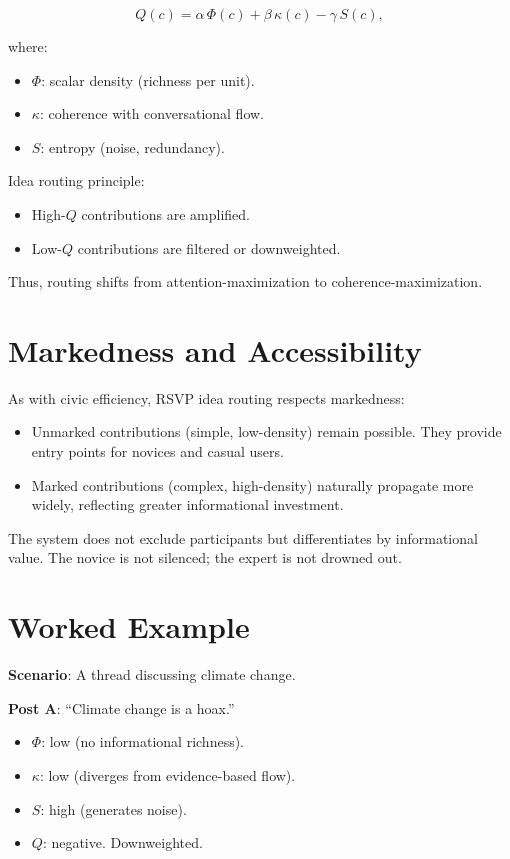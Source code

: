 \documentclass[openany]{book}
\begin{document}
\[ Q(c) = \alpha \, \Phi(c) + \beta \, \kappa(c) - \gamma \, S(c), \]

where:

\begin{itemize}
    \item $\Phi$: scalar density (richness per unit).
    \item $\kappa$: coherence with conversational flow.
    \item $S$: entropy (noise, redundancy).
\end{itemize}

Idea routing principle:

\begin{itemize}
    \item High-$Q$ contributions are amplified.
    \item Low-$Q$ contributions are filtered or downweighted.
\end{itemize}

Thus, routing shifts from attention-maximization to coherence-maximization.

\section{Markedness and Accessibility}

As with civic efficiency, RSVP idea routing respects markedness:

\begin{itemize}
    \item Unmarked contributions (simple, low-density) remain possible. They provide entry points for novices and casual users.
    \item Marked contributions (complex, high-density) naturally propagate more widely, reflecting greater informational investment.
\end{itemize}

The system does not exclude participants but differentiates by informational value. The novice is not silenced; the expert is not drowned out.

\section{Worked Example}

\textbf{Scenario}: A thread discussing climate change.

\textbf{Post A}: ``Climate change is a hoax.''

\begin{itemize}
    \item $\Phi$: low (no informational richness).
    \item $\kappa$: low (diverges from evidence-based flow).
    \item $S$: high (generates noise).
    \item $Q$: negative. Downweighted.
\end{itemize}
\end{document}
